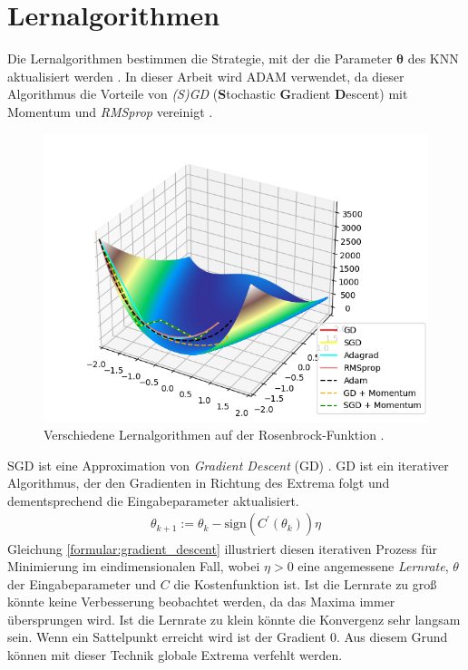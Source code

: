 \section{Lernalgorithmen}
Die Lernalgorithmen bestimmen die Strategie, mit der die Parameter $\boldsymbol\theta$ des KNN aktualisiert werden \cite{higham2019deep}.
In dieser Arbeit wird ADAM verwendet, da dieser Algorithmus die Vorteile von \textit{(S)GD} (\textbf{S}tochastic \textbf{G}radient \textbf{D}escent)
mit Momentum und \textit{RMSprop} vereinigt \cite{kingma2014adam, higham2019deep}.
\begin{figure}[h!]
    \centering
    \includegraphics[width=0.8\linewidth]{images/learn_algorithms.png}
    \caption{Verschiedene Lernalgorithmen auf der Rosenbrock-Funktion \cite{rosenbrock}.}
    \label{fig:learn_algorithms}
\end{figure}
\newline
SGD ist eine Approximation von \textit{Gradient Descent} (GD) \cite{bengio2017deep}.
GD ist ein iterativer Algorithmus, der den Gradienten in Richtung des Extrema folgt und dementsprechend die Eingabeparameter aktualisiert.
\begin{align}
    \label{formular:gradient_descent}
    \theta_{k+1} := \theta_k - \text{sign}(C^{\prime}(\theta_k))\eta
\end{align}
Gleichung \ref{formular:gradient_descent} illustriert diesen iterativen Prozess für Minimierung im eindimensionalen Fall,
wobei $\eta > 0$ eine angemessene \textit{Lernrate}, $\theta$ der Eingabeparameter und $C$ die Kostenfunktion ist.
Ist die Lernrate zu groß könnte keine Verbesserung beobachtet werden, da das Maxima immer übersprungen wird.
Ist die Lernrate zu klein könnte die Konvergenz sehr langsam sein.
Wenn ein Sattelpunkt erreicht wird ist der Gradient 0.
Aus diesem Grund können mit dieser Technik globale Extrema verfehlt werden.
